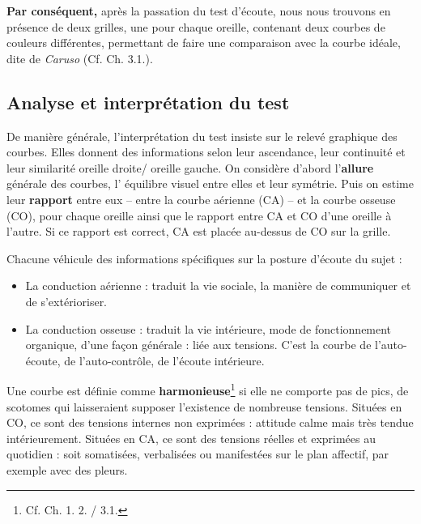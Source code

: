  \textbf{Par conséquent,} après la passation du test d\textquoteright écoute, nous nous
trouvons en présence de deux grilles, une  pour chaque oreille, contenant deux courbes
de couleurs différentes, permettant de faire une comparaison avec la courbe
 idéale, dite de \textit{Caruso} (Cf. Ch. 3.1.).

  
  
  
  

\subsection {Analyse et interprétation du test}


De manière générale, l'interprétation du test insiste sur le relevé graphique
des
courbes. Elles donnent des informations selon leur ascendance, leur
continuité et leur similarité oreille droite/ oreille gauche.
On considère d'abord l'\textbf{allure }générale des courbes,
 l' équilibre visuel entre elles et leur symétrie.
Puis on estime
leur\textbf{ rapport} entre eux -- entre la courbe aérienne (CA) -- et la courbe osseuse (CO),
pour chaque oreille ainsi que le rapport entre CA et CO d\textquoteright une
oreille à l'autre. Si ce rapport est correct, CA est placée au-dessus
de CO sur la grille.

Chacune  véhicule des informations spécifiques
sur la posture d'écoute du sujet :
\begin{itemize}
\item La conduction aérienne : traduit la vie sociale, la manière de communiquer
et de s'extérioriser.
\item La conduction osseuse : traduit la vie intérieure, mode de fonctionnement
organique, d'une façon générale : liée aux tensions. C'est la courbe
de l\textquoteright auto-écoute, de l\textquoteright auto-contrôle,
de l'écoute intérieure.
\end{itemize}

Une courbe est définie comme \textbf{harmonieuse}\footnote{Cf. Ch. 1. 2. / 3.1.}
si elle ne comporte pas de
pics, de scotomes
qui laisseraient
supposer l'existence de nombreuse tensions.
Situées en CO, ce sont des tensions internes non exprimées : attitude
calme mais très tendue intérieurement.
Situées en CA, ce sont des tensions réelles et exprimées au quotidien
: soit somatisées, verbalisées ou manifestées sur le plan
affectif, par exemple avec des pleurs.

